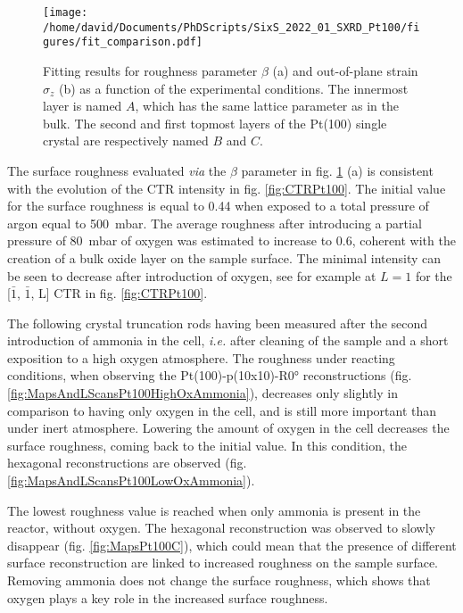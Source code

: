 \begin{figure}[!htb]
    \centering
    \texttt{[image: /home/david/Documents/PhDScripts/SixS\_2022\_01\_SXRD\_Pt100/figures/fit\_comparison.pdf]}
    \caption{
        Fitting results for roughness parameter $\beta$ (a) and out-of-plane strain $\sigma_z$ (b) as a function of the experimental conditions.
        The innermost layer is named $A$, which has the same lattice parameter as in the bulk.
        The second and first topmost layers of the Pt(100) single crystal are respectively named $B$ and $C$.
    }
    \label{fig:CTRFit100}
\end{figure}

The surface roughness evaluated \textit{via} the $\beta$ parameter in fig. \ref{fig:CTRFit100} (a) is consistent with the evolution of the CTR intensity in fig. \ref{fig:CTRPt100}.
The initial value for the surface roughness is equal to \num{0.44} when exposed to a total pressure of argon equal to \qty{500}{\milli\bar}.
The average roughness after introducing a partial pressure of \qty{80}{\milli\bar} of oxygen was estimated to increase to \num{0.6}, coherent with the creation of a bulk oxide layer on the sample surface.
The minimal intensity can be seen to decrease after introduction of oxygen, see for example at $L=1$ for the [$\bar{1}$, $\bar{1}$, L] CTR in fig. \ref{fig:CTRPt100}.

The following crystal truncation rods having been measured after the second introduction of ammonia in the cell, \textit{i.e.} after cleaning of the sample and a short exposition to a high oxygen atmosphere.
The roughness under reacting conditions, when observing the Pt(100)-p(10x10)-R\ang{0} reconstructions (fig. \ref{fig:MapsAndLScansPt100HighOxAmmonia}), decreases only slightly in comparison to having only oxygen in the cell, and is still more important than under inert atmosphere.
Lowering the amount of oxygen in the cell decreases the surface roughness, coming back to the initial value.
In this condition, the hexagonal reconstructions are observed (fig. \ref{fig:MapsAndLScansPt100LowOxAmmonia}).

The lowest roughness value is reached when only ammonia is present in the reactor, without oxygen.
The hexagonal reconstruction was observed to slowly disappear (fig. \ref{fig:MapsPt100C}), which could mean that the presence of different surface reconstruction are linked to increased roughness on the sample surface.
Removing ammonia does not change the surface roughness, which shows that oxygen plays a key role in the increased surface roughness.

